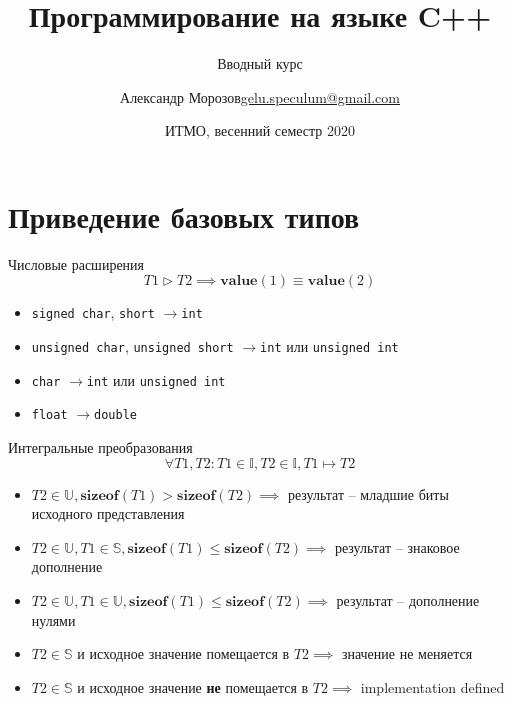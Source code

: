 \documentclass[unknownkeysallowed,xcolor=table]{beamer}
\title[C++]
{Программирование на языке C++}
\subtitle{Вводный курс}
\author[А.~Б.~Морозов]
{
  \texorpdfstring{Александр Морозов\newline\href{mailto:gelu.speculum@gmail.com}{gelu.speculum@gmail.com}}
  {Александр Морозов}
}
\date[ITMO 2020]
{ИТМО, весенний семестр 2020}
\newcommand{\rarr}{$\rightarrow$}
\begin{document}
 
\frame{\titlepage}

\section{Приведение базовых типов}

\begin{frame}[fragile]{Числовые расширения}
  \[
    T1 \triangleright T2 \implies \mathbf{value}(1) \equiv \mathbf{value}(2)
  \]
  
  \vspace{1em}

  \begin{itemize}
    \item \lstinline{signed char}, \lstinline{short} \rarr \lstinline{int} \vspace{1em}
    \item \lstinline{unsigned char}, \lstinline{unsigned short} \rarr \lstinline{int} или \lstinline{unsigned int} \vspace{1em}
    \item \lstinline{char} \rarr \lstinline{int} или \lstinline{unsigned int} \vspace{1em}
    \item \lstinline{float} \rarr \lstinline{double}
  \end{itemize}
\end{frame}

\begin{frame}[fragile]{Интегральные преобразования}
  \[
    \forall T1, T2: T1 \in \mathbb{I}, T2 \in \mathbb{I}, T1 \mapsto T2
  \]

  \vspace{0.5em}

  \begin{itemize}
    \item $T2 \in \mathbb{U}, \mathbf{sizeof}(T1) > \mathbf{sizeof}(T2) \implies$ результат -- младшие биты исходного представления \vspace{0.5em}
    \item $T2 \in \mathbb{U}, T1 \in \mathbb{S}, \mathbf{sizeof}(T1) \leq \mathbf{sizeof}(T2) \implies$ результат -- знаковое дополнение \vspace{0.5em}
    \item $T2 \in \mathbb{U}, T1 \in \mathbb{U}, \mathbf{sizeof}(T1) \leq \mathbf{sizeof}(T2) \implies$ результат -- дополнение нулями \vspace{0.5em}
    \item $T2 \in \mathbb{S}$ и исходное значение помещается в $T2 \implies$ значение не меняется \vspace{0.5em}
    \item $T2 \in \mathbb{S}$ и исходное значение \textbf{не} помещается в $T2 \implies$ implementation defined
  \end{itemize}
\end{frame}
\end{document}
